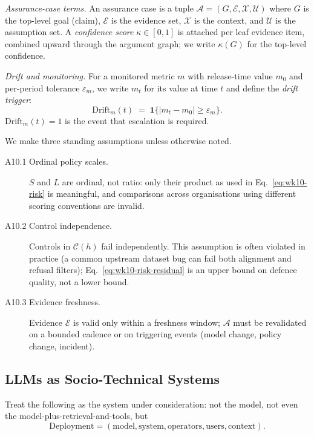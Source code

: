 \begin{notationbox}
\textit{Assurance-case terms.} An assurance case is a tuple
$\mathcal{A} = (G, \mathcal{E}, \mathcal{X}, \mathcal{U})$ where $G$ is the top-level goal
(claim), $\mathcal{E}$ is the evidence set, $\mathcal{X}$ is the context, and
$\mathcal{U}$ is the assumption set. A \emph{confidence score}
$\kappa \in [0, 1]$ is attached per leaf evidence item, combined
upward through the argument graph; we write $\kappa(G)$ for the
top-level confidence.

\textit{Drift and monitoring.} For a monitored metric $m$ with
release-time value $m_0$ and per-period tolerance $\varepsilon_m$,
we write $m_t$ for its value at time $t$ and define the
\emph{drift trigger}:
\begin{equation}
  \mathrm{Drift}_m(t) \;=\;
    \mathbf{1}\!\bigl\{ |m_t - m_0| \ge \varepsilon_m \bigr\}.
  \label{eq:wk10-drift}
\end{equation}
$\mathrm{Drift}_m(t) = 1$ is the event that escalation is
required.

We make three standing assumptions unless otherwise noted.
\begin{description}
  \item[A10.1 Ordinal policy scales.] $S$ and $L$ are ordinal,
    not ratio: only their product as used in
    Eq.~\eqref{eq:wk10-risk} is meaningful, and comparisons across
    organisations using different scoring conventions are invalid.
  \item[A10.2 Control independence.] Controls in $\mathcal{C}(h)$ fail
    independently. This assumption is often violated in practice
    (a common upstream dataset bug can fail both alignment and
    refusal filters); Eq.~\eqref{eq:wk10-risk-residual} is an
    upper bound on defence quality, not a lower bound.
  \item[A10.3 Evidence freshness.] Evidence $\mathcal{E}$ is valid only
    within a freshness window; $\mathcal{A}$ must be revalidated on a
    bounded cadence or on triggering events (model change, policy
    change, incident).
\end{description}
\end{notationbox}

\subsection{LLMs as Socio-Technical Systems}

Treat the following as the system under consideration: not the
model, not even the model-plus-retrieval-and-tools, but
$$ \text{Deployment} = (\text{model}, \text{system}, \text{operators}, \text{users}, \text{context}). $$

